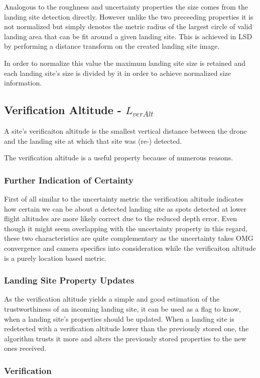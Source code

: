 Analogous to the roughness and uncertainty properties the size comes from the landing site detection directly. However unlike the two preceeding properties it is not normalized but simply denotes the metric radius of the largest circle of valid landing area that can be fit around a given landing site. This is achieved in LSD by performing a distance transform on the created landing site image.

In order to normalize this value the maximum landing site size is retained and each landing site's size is divided by it in order to achieve normalized size information.

\subsection{Verification Altitude - $L_{verAlt}$}

A site's verificaiton altitude is the smallest vertical distance between the drone and the landing site at which that site was (re-) detected. 

The verification altitude is a useful property because of numerous reasons.
\subsubsection{Further Indication of Certainty}
First of all similar to the uncertainty metric the verification altitude indicates how certain we can be about a detected landing site as spots detected at lower flight altitudes are more likely correct due to the reduced depth error. Even though it might seem overlapping with the uncertainty property in this regard, these two characteristics are quite complementary as the uncertainty takes OMG convergence and camera specifics into consideration while the verificaiton altitude is a purely location based metric.

\subsubsection{Landing Site Property Updates}
As the verification altitude yields a simple and good estimation of the trustworthiness of an incoming landing site, it can be used as a flag to know, when a landing site's properties should be updated. When a landing site is redetected with a verification altitude lower than the previously stored one, the algorithm trusts it more and alters the previously stored properties to the new ones received.

\subsubsection{Verification}

